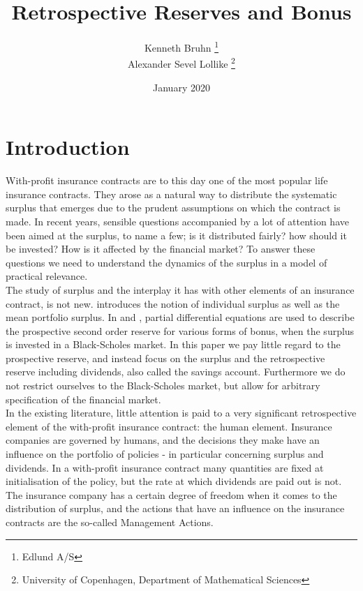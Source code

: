 \documentclass[12pt]{article}
\title{Retrospective Reserves and Bonus}
\date{January 2020}
\author{Kenneth Bruhn \thanks{Edlund A/S} \\ Alexander Sevel Lollike \thanks{University of Copenhagen, Department of Mathematical Sciences}}
\theoremstyle{my_thm}
\begin{document}
\maketitle

\newpage


\section{Introduction}
With-profit insurance contracts are to this day one of the most popular life insurance contracts. They arose as a natural way to distribute the systematic surplus that emerges due to the prudent assumptions on which the contract is made. In recent years, sensible questions accompanied by a lot of attention have been aimed at the surplus, to name a few; is it distributed fairly? how should it be invested? How is it affected by the financial market? To answer these questions we need to understand the dynamics of the surplus in a model of practical relevance.
\\[12pt]
The study of surplus and the interplay it has with other elements of an insurance contract, is not new. \citet{NorbergB} introduces the notion of individual surplus as well as the mean portfolio surplus. In \citet{Steffensen0} and \citet{Steffensen1}, partial differential equations are used to describe the prospective second order reserve for various forms of bonus, when the surplus is invested in a Black-Scholes market. In this paper we pay little regard to the prospective reserve, and instead focus on the surplus and the retrospective reserve including dividends, also called the savings account. Furthermore we do not restrict ourselves to the Black-Scholes market, but allow for arbitrary specification of the financial market.
\\[12pt]
In the existing literature, little attention is paid to a very significant retrospective element of the with-profit insurance contract: the human element. Insurance companies are governed by humans, and the decisions they make have an influence on the portfolio of policies - in particular concerning surplus and dividends. In a with-profit insurance contract many quantities are fixed at initialisation of the policy, but the rate at which dividends are paid out is not. The insurance company has a certain degree of freedom when it comes to the distribution of surplus, and the actions that have an influence on the insurance contracts are the so-called Management Actions.
\end{document}
